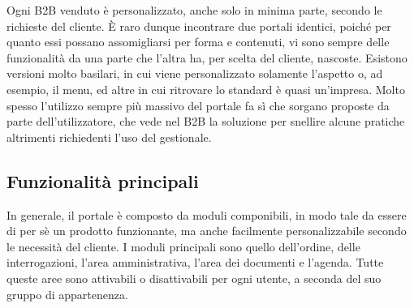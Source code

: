 Ogni B2B venduto è personalizzato, anche solo in minima parte, secondo le richieste del cliente. È raro dunque incontrare due portali identici, poiché per quanto essi possano assomigliarsi per forma e contenuti, vi sono sempre delle funzionalità da una parte che l'altra ha, per scelta del cliente, nascoste.
Esistono versioni molto basilari, in cui viene personalizzato solamente l'aspetto o, ad esempio, il menu, ed altre in cui ritrovare lo standard è quasi un'impresa. Molto spesso l'utilizzo sempre più massivo del portale fa sì che sorgano proposte da parte dell'utilizzatore, che vede nel B2B la soluzione per snellire alcune pratiche altrimenti richiedenti l'uso del gestionale.

\subsection{Funzionalità principali}
In generale, il portale è composto da moduli componibili, in modo tale da essere di per sè un prodotto funzionante, ma anche facilmente personalizzabile secondo le necessità del cliente. I moduli principali sono quello dell'ordine, delle interrogazioni, l'area amministrativa, l'area dei documenti e l'agenda. Tutte queste aree sono attivabili o disattivabili per ogni utente, a seconda del suo gruppo di appartenenza. 

